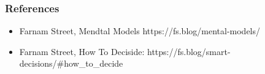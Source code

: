 \begin{frame}[fragile]\frametitle{References}
\begin{itemize}
\item Farnam Street, Mendtal Models https://fs.blog/mental-models/

\item Farnam Street, How To Deciside: https://fs.blog/smart-decisions/\#how\_to\_decide
\end{itemize}
\end{frame}